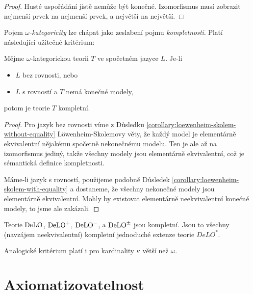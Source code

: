 \begin{proof}
Husté uspořádání jistě nemůže být konečné. Izomorfismus musí zobrazit nejmenší prvek na nejmenší prvek, a největší na největší.
\end{proof}

Pojem \emph{$\omega$-kategoricity} lze chápat jako zeslabení pojmu \emph{kompletnosti}. Platí následující užitečné kritérium:

\begin{theorem}
Mějme $\omega$-kategorickou teorii $T$ ve spočetném jazyce $L$. Je-li
\begin{itemize}
    \item $L$ bez rovnosti, nebo
    \item $L$ s rovností a $T$ nemá konečné modely,
\end{itemize}
potom je teorie $T$ kompletní.
\end{theorem}
\begin{proof}
Pro jazyk bez rovnosti víme z Důsledku \ref{corollary:loewenheim-skolem-without-equality} Löwenheim-Skolemovy věty, že každý model je elementárně ekvivalentní nějakému spočetně nekonečnému modelu. Ten je ale až na izomorfismus jediný, takže všechny modely jsou elementárně ekvivalentní, což je sémantická definice kompletnosti.

Máme-li jazyk s rovností, použijeme podobně Důsledek \ref{corollary:loewenheim-skolem-with-equality} a dostaneme, že všechny nekonečné modely jsou elementárně ekvivalentní. Mohly by existovat elementárně neekvivalentní konečné modely, to jsme ale zakázali.
\end{proof}

\begin{corollary}\label{corollary:complete-simple-extensions-of-delo}
    Teorie $\operatorname{DeLO}$, $\operatorname{DeLO}^+$, $\operatorname{DeLO}^-$, a $\operatorname{DeLO}^\pm$ jsou kompletní. Jsou to všechny (navzájem neekvivalentní) kompletní jednoduché extenze teorie $DeLO^*$.
\end{corollary}

\begin{remark}
Analogické kritérium platí i pro kardinality $\kappa$ větší než $\omega$.
\end{remark}


\section{Axiomatizovatelnost}\label{section:axiomatizability}

